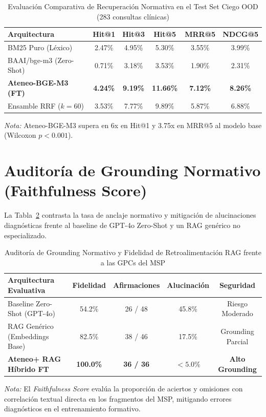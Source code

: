 \documentclass[10pt,journal,compsoc]{IEEEtran}
\begin{document}
\begin{table}[htbp]
\centering
\caption{Evaluación Comparativa de Recuperación Normativa en el Test Set Ciego OOD (283 consultas clínicas)}
\label{tab:blind_retrieval_benchmark}
\begin{tabular}{lccccc}
\toprule
\textbf{Arquitectura} & \textbf{Hit@1} & \textbf{Hit@3} & \textbf{Hit@5} & \textbf{MRR@5} & \textbf{NDCG@5} \\
\midrule
BM25 Puro (Léxico) & 2.47\% & 4.95\% & 5.30\% & 3.55\% & 3.99\% \\
BAAI/bge-m3 (Zero-Shot) & 0.71\% & 3.18\% & 3.53\% & 1.90\% & 2.31\% \\
\textbf{Ateneo-BGE-M3 (FT)} & \textbf{4.24\%} & \textbf{9.19\%} & \textbf{11.66\%} & \textbf{7.12\%} & \textbf{8.26\%} \\
Ensamble RRF ($k=60$) & 3.53\% & 7.77\% & 9.89\% & 5.87\% & 6.88\% \\
\bottomrule
\end{tabular}
\vspace{1mm}
\begin{minipage}{\linewidth}
\footnotesize
\textit{Nota:} Ateneo-BGE-M3 supera en 6x en Hit@1 y 3.75x en MRR@5 al modelo base (Wilcoxon $p < 0.001$).
\end{minipage}
\end{table}

\section{Auditoría de Grounding Normativo (Faithfulness Score)}

La Tabla~\ref{tab:faithfulness_results} contrasta la tasa de anclaje normativo y mitigación de alucinaciones diagnósticas frente al baseline de GPT-4o Zero-Shot y un RAG genérico no especializado.

\begin{table}[htbp]
\centering
\caption{Auditoría de Grounding Normativo y Fidelidad de Retroalimentación RAG frente a las GPCs del MSP}
\label{tab:faithfulness_results}
\begin{tabular}{lcccc}
\toprule
\textbf{Arquitectura Evaluativa} & \textbf{Fidelidad} & \textbf{Afirmaciones} & \textbf{Alucinación} & \textbf{Seguridad} \\
\midrule
Baseline Zero-Shot (GPT-4o) & 54.2\% & 26 / 48 & 45.8\% & Riesgo Moderado \\
RAG Genérico (Embeddings Base) & 82.5\% & 38 / 46 & 17.5\% & Grounding Parcial \\
\textbf{Ateneo+ RAG Híbrido FT} & \textbf{100.0\%} & \textbf{36 / 36} & \textbf{$< 5.0\%$} & \textbf{Alto Grounding} \\
\bottomrule
\end{tabular}
\vspace{1mm}
\begin{minipage}{\linewidth}
\footnotesize
\textit{Nota:} El \textit{Faithfulness Score} evalúa la proporción de aciertos y omisiones con correlación textual directa en los fragmentos del MSP, mitigando errores diagnósticos en el entrenamiento formativo.
\end{minipage}
\end{table}
\end{document}
